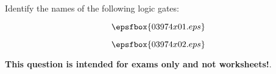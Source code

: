 

Identify the names of the following logic gates:

$$\epsfbox{03974x01.eps}$$







$$\epsfbox{03974x02.eps}$$







{\bf This question is intended for exams only and not worksheets!}.




